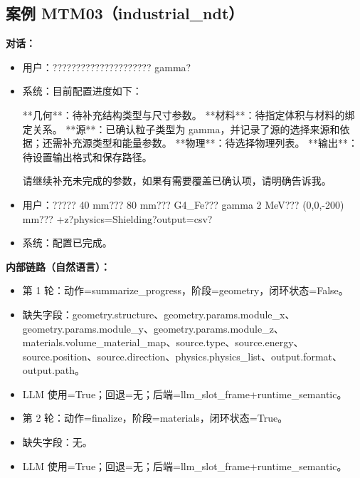 \documentclass[11pt]{ctexart}
\begin{document}
\subsection{案例 MTM03（industrial\_ndt）}
\textbf{对话：}
\begin{itemize}
\item 用户：????????????????????? gamma?
\item 系统：目前配置进度如下：

**几何**：待补充结构类型与尺寸参数。  
**材料**：待指定体积与材料的绑定关系。  
**源**：已确认粒子类型为 gamma，并记录了源的选择来源和依据；还需补充源类型和能量参数。  
**物理**：待选择物理列表。  
**输出**：待设置输出格式和保存路径。

请继续补充未完成的参数，如果有需要覆盖已确认项，请明确告诉我。
\item 用户：????? 40 mm??? 80 mm??? G4\_Fe??? gamma 2 MeV??? (0,0,-200) mm??? +z?physics=Shielding?output=csv?
\item 系统：配置已完成。
\end{itemize}
\textbf{内部链路（自然语言）：}
\begin{itemize}
\item 第 1 轮：动作=summarize\_progress，阶段=geometry，闭环状态=False。
\item 缺失字段：geometry.structure、geometry.params.module\_x、geometry.params.module\_y、geometry.params.module\_z、materials.volume\_material\_map、source.type、source.energy、source.position、source.direction、physics.physics\_list、output.format、output.path。
\item LLM 使用=True；回退=无；后端=llm\_slot\_frame+runtime\_semantic。
\item 第 2 轮：动作=finalize，阶段=materials，闭环状态=True。
\item 缺失字段：无。
\item LLM 使用=True；回退=无；后端=llm\_slot\_frame+runtime\_semantic。
\end{itemize}
\end{document}
